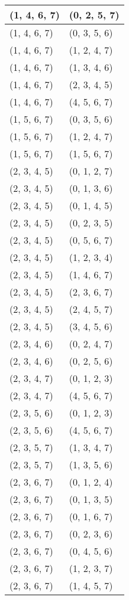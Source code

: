 \begin{footnotesize}
\begin{longtable}[c]{|l|l|}
(1, 4, 6, 7)
&(0, 2, 5, 7)
\\ \hline
(1, 4, 6, 7)
&(0, 3, 5, 6)
\\ \hline
(1, 4, 6, 7)
&(1, 2, 4, 7)
\\ \hline
(1, 4, 6, 7)
&(1, 3, 4, 6)
\\ \hline
(1, 4, 6, 7)
&(2, 3, 4, 5)
\\ \hline
(1, 4, 6, 7)
&(4, 5, 6, 7)
\\ \hline
(1, 5, 6, 7)
&(0, 3, 5, 6)
\\ \hline
(1, 5, 6, 7)
&(1, 2, 4, 7)
\\ \hline
(1, 5, 6, 7)
&(1, 5, 6, 7)
\\ \hline
(2, 3, 4, 5)
&(0, 1, 2, 7)
\\ \hline
(2, 3, 4, 5)
&(0, 1, 3, 6)
\\ \hline
(2, 3, 4, 5)
&(0, 1, 4, 5)
\\ \hline
(2, 3, 4, 5)
&(0, 2, 3, 5)
\\ \hline
(2, 3, 4, 5)
&(0, 5, 6, 7)
\\ \hline
(2, 3, 4, 5)
&(1, 2, 3, 4)
\\ \hline
(2, 3, 4, 5)
&(1, 4, 6, 7)
\\ \hline
(2, 3, 4, 5)
&(2, 3, 6, 7)
\\ \hline
(2, 3, 4, 5)
&(2, 4, 5, 7)
\\ \hline
(2, 3, 4, 5)
&(3, 4, 5, 6)
\\ \hline
(2, 3, 4, 6)
&(0, 2, 4, 7)
\\ \hline
(2, 3, 4, 6)
&(0, 2, 5, 6)
\\ \hline
(2, 3, 4, 7)
&(0, 1, 2, 3)
\\ \hline
(2, 3, 4, 7)
&(4, 5, 6, 7)
\\ \hline
(2, 3, 5, 6)
&(0, 1, 2, 3)
\\ \hline
(2, 3, 5, 6)
&(4, 5, 6, 7)
\\ \hline
(2, 3, 5, 7)
&(1, 3, 4, 7)
\\ \hline
(2, 3, 5, 7)
&(1, 3, 5, 6)
\\ \hline
(2, 3, 6, 7)
&(0, 1, 2, 4)
\\ \hline
(2, 3, 6, 7)
&(0, 1, 3, 5)
\\ \hline
(2, 3, 6, 7)
&(0, 1, 6, 7)
\\ \hline
(2, 3, 6, 7)
&(0, 2, 3, 6)
\\ \hline
(2, 3, 6, 7)
&(0, 4, 5, 6)
\\ \hline
(2, 3, 6, 7)
&(1, 2, 3, 7)
\\ \hline
(2, 3, 6, 7)
&(1, 4, 5, 7)
\\ \hline

\end{longtable}
\end{footnotesize}
